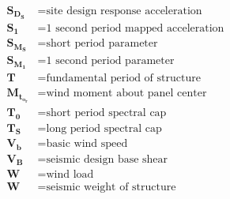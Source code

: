 \begin{align*}
    \bm{S_D_S}   & = \textrm{site design response acceleration}       \\
    \bm{S_1}     & = \textrm{1 second period mapped acceleration}     \\
    \bm{S_M_S}   & = \textrm{short period parameter}                  \\
    \bm{S_M_1}   & = \textrm{1 second period parameter}               \\
    \bm{T}       & = \textrm{fundamental period of structure}         \\
    \bm{M_t_o_r} & = \textrm{wind moment about panel center }         \\
    \bm{T_0}     & = \textrm{short period spectral cap }              \\
    \bm{T_S}     & = \textrm{long period spectral cap}                \\
    \bm{V_b}     & = \textrm{basic wind speed}                        \\
    \bm{V_B}     & = \textrm{seismic design base shear}               \\
    \bm{W}       & = \textrm{wind load}                               \\
    \bm{W}       & = \textrm{seismic weight of structure }            \\
\end{align*}
\endgroup